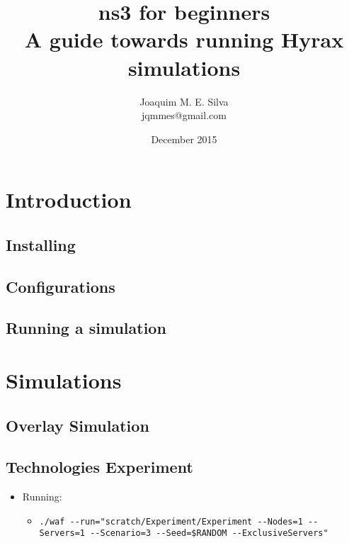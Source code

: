 \documentclass[a4paper]{book}
\begin{document}
\title{{\Huge ns3 for beginners} \\
\vspace{1em}\large A guide towards running Hyrax simulations\vspace{5em}}
\author{Joaquim M. E. Silva \\ jqmmes@gmail.com}
\date{December 2015}
\maketitle

\tableofcontents

\chapter{Introduction}

\section{Installing}

\section{Configurations}

\section{Running a simulation}


\chapter{Simulations}

\section{Overlay Simulation}


\section{Technologies Experiment}

\begin{itemize}
	\item[] Running:
	\begin{itemize}
		\item[] \footnotesize \begin{verbatim}./waf --run="scratch/Experiment/Experiment --Nodes=1 --Servers=1 --Scenario=3 --Seed=$RANDOM --ExclusiveServers"\end{verbatim}
	\end{itemize}
\end{itemize}
\end{document}
